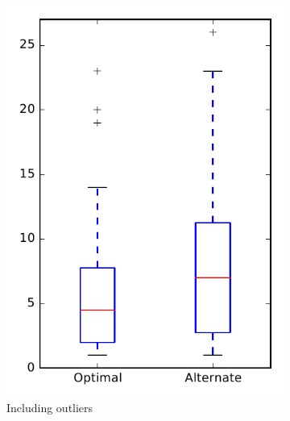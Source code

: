 
\begin{figure}
    \centering
    \begin{subfigure}{.4\textwidth}
        \centering
        \includegraphics[height=0.4\textheight]{figures/combo/dit_rq1_tika}
        \caption{Including outliers}\label{fig:combo:dit:rq1:tika_outlier}
    \end{subfigure}%
    \begin{subfigure}{.4\textwidth}
        \centering

\end{subfigure}
\end{figure}
